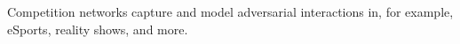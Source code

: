 \documentclass[preview]{standalone}
\begin{document}
Competition networks capture and model adversarial interactions in, for example, eSports, reality shows, and more.\\
\end{document}
